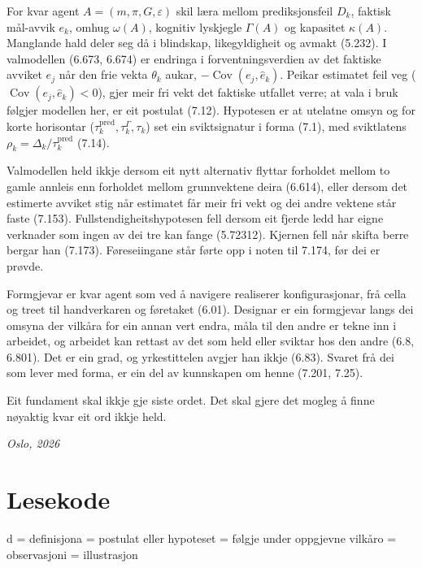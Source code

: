 For kvar agent \(A=(m,\pi,G,\varepsilon)\) skil læra mellom prediksjonsfeil \(D_k\), faktisk mål-avvik \(e_k\), omhug \(\omega(A)\), kognitiv lyskjegle \(\Gamma(A)\) og kapasitet \(\kappa(A)\). Manglande hald deler seg då i blindskap, likegyldigheit og avmakt (5.232). I valmodellen (6.673, 6.674) er endringa i forventningsverdien av det faktiske avviket \(e_j\) når den frie vekta \(\theta_k\) aukar, \(-\operatorname{Cov}(e_j,\hat{e}_k)\). Peikar estimatet feil veg (\(\operatorname{Cov}(e_j,\hat{e}_k)<0\)), gjer meir fri vekt det faktiske utfallet verre; at vala i bruk følgjer modellen her, er eit postulat (7.12). Hypotesen er at utelatne omsyn og for korte horisontar (\(\tau_k^{\text{pred}},\tau_k^\Gamma,\tau_k\)) set ein sviktsignatur i forma (7.1), med sviktlatens \(\rho_k=\Delta_k/\tau_k^{\text{pred}}\) (7.14).

Valmodellen held ikkje dersom eit nytt alternativ flyttar forholdet mellom to gamle annleis enn forholdet mellom grunnvektene deira (6.614), eller dersom det estimerte avviket stig når estimatet får meir fri vekt og dei andre vektene står faste (7.153). Fullstendigheitshypotesen fell dersom eit fjerde ledd har eigne verknader som ingen av dei tre kan fange (5.72312). Kjernen fell når skifta berre bergar han (7.173). Føreseiingane står førte opp i noten til 7.174, før dei er prøvde.

Formgjevar er kvar agent som ved å navigere realiserer konfigurasjonar, frå cella og treet til handverkaren og føretaket (6.01). Designar er ein formgjevar langs dei omsyna der vilkåra for ein annan vert endra, måla til den andre er tekne inn i arbeidet, og arbeidet kan rettast av det som held eller sviktar hos den andre (6.8, 6.801). Det er ein grad, og yrkestittelen avgjer han ikkje (6.83). Svaret frå dei som lever med forma, er ein del av kunnskapen om henne (7.201, 7.25).

Eit fundament skal ikkje gje siste ordet. Det skal gjere det mogleg å finne nøyaktig kvar eit ord ikkje held.

\emph{Oslo, 2026}


\section{Lesekode}

d = definisjon\newline{}a = postulat eller hypotese\newline{}t = følgje under oppgjevne vilkår\newline{}o = observasjon\newline{}i = illustrasjon

